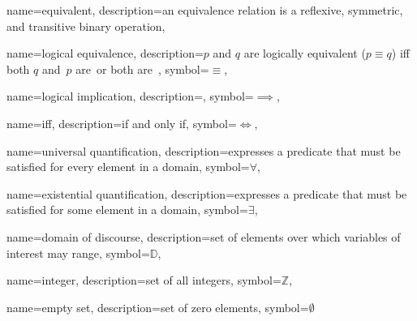 {
  name={equivalent},
  description={an equivalence relation is a reflexive, symmetric, and
               transitive binary operation},
}

{
  name={logical equivalence},
  description={$p$ and $q$ are logically equivalent ($p\equiv q$) \gls{iff}
               both $q$ and~$p$ are~\true or both are~\false},
  symbol={\ensuremath{\equiv}},
}

{
  name={logical implication},
  description={},
  symbol={\ensuremath{\implies}},
}

{
  name={iff},
  description={if and only if},
  symbol={\ensuremath{\iff}},
}

{
  name={universal quantification},
  description={expresses a predicate that must be satisfied for every
               element in a \gls{domain}},
  symbol={\ensuremath{\forall}},
}

{
  name={existential quantification},
  description={expresses a predicate that must be satisfied for some
               element in a \gls{domain}},
  symbol={\ensuremath{\exists}},
}

{
  name={domain of discourse},
  description={set of elements over which variables of interest may range},
  symbol={\ensuremath{\mathbb{D}}},
}

{
  name={integer},
  description={set of all integers},
  symbol={\ensuremath{\mathbb{Z}}},
}

{
  name={empty set},
  description={set of zero elements},
  symbol={\ensuremath{\emptyset}}
}
